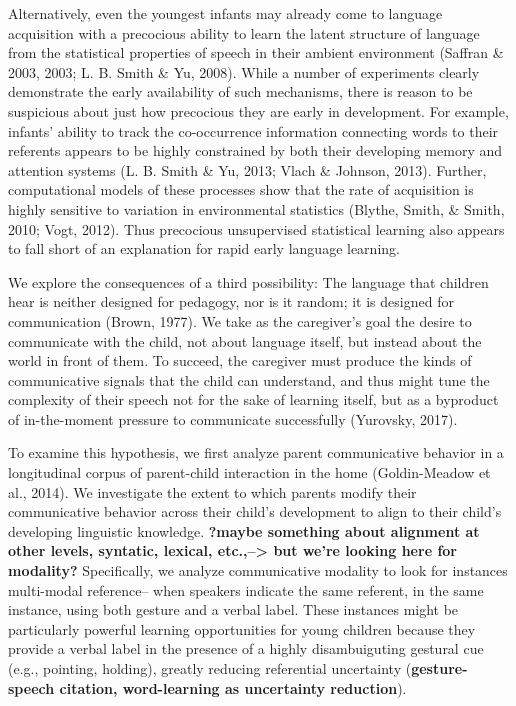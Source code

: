 \documentclass[10pt, letterpaper]{article}
\begin{document}
Alternatively, even the youngest infants may already come to language
acquisition with a precocious ability to learn the latent structure of
language from the statistical properties of speech in their ambient
environment (Saffran \& 2003, 2003; L. B. Smith \& Yu, 2008). While a
number of experiments clearly demonstrate the early availability of such
mechanisms, there is reason to be suspicious about just how precocious
they are early in development. For example, infants' ability to track
the co-occurrence information connecting words to their referents
appears to be highly constrained by both their developing memory and
attention systems (L. B. Smith \& Yu, 2013; Vlach \& Johnson, 2013).
Further, computational models of these processes show that the rate of
acquisition is highly sensitive to variation in environmental statistics
(Blythe, Smith, \& Smith, 2010; Vogt, 2012). Thus precocious
unsupervised statistical learning also appears to fall short of an
explanation for rapid early language learning.

We explore the consequences of a third possibility: The language that
children hear is neither designed for pedagogy, nor is it random; it is
designed for communication (Brown, 1977). We take as the caregiver's
goal the desire to communicate with the child, not about language
itself, but instead about the world in front of them. To succeed, the
caregiver must produce the kinds of communicative signals that the child
can understand, and thus might tune the complexity of their speech not
for the sake of learning itself, but as a byproduct of in-the-moment
pressure to communicate successfully (Yurovsky, 2017).

To examine this hypothesis, we first analyze parent communicative
behavior in a longitudinal corpus of parent-child interaction in the
home (Goldin-Meadow et al., 2014). We investigate the extent to which
parents modify their communicative behavior across their child's
development to align to their child's developing linguistic knowledge.
\textbf{?maybe something about alignment at other levels, syntatic,
lexical, etc.,--\textgreater{} but we're looking here for modality?}
Specifically, we analyze communicative modality to look for instances
multi-modal reference-- when speakers indicate the same referent, in the
same instance, using both gesture and a verbal label. These instances
might be particularly powerful learning opportunities for young children
because they provide a verbal label in the presence of a highly
disambuiguting gestural cue (e.g., pointing, holding), greatly reducing
referential uncertainty (\textbf{gesture-speech citation, word-learning
as uncertainty reduction}).
\end{document}

